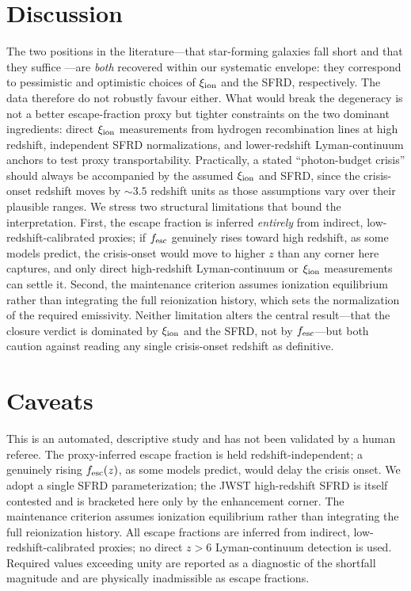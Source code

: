 \documentclass[twocolumn]{aastex631}
\begin{document}
\section{Discussion}
The two positions in the literature---that star-forming galaxies fall short \citep{Munoz2024,Davies2021} and that they suffice \citep{Duncan2015}---are \emph{both} recovered within our systematic envelope: they correspond to pessimistic and optimistic choices of $\xi_{\rm ion}$ and the SFRD, respectively. The data therefore do not robustly favour either. What would break the degeneracy is not a better escape-fraction proxy but tighter constraints on the two dominant ingredients: direct $\xi_{\rm ion}$ measurements from hydrogen recombination lines at high redshift, independent SFRD normalizations, and lower-redshift Lyman-continuum anchors to test proxy transportability. Practically, a stated ``photon-budget crisis'' should always be accompanied by the assumed $\xi_{\rm ion}$ and SFRD, since the crisis-onset redshift moves by $\sim3.5$ redshift units as those assumptions vary over their plausible ranges. We stress two structural limitations that bound the interpretation. First, the escape fraction is inferred \emph{entirely} from indirect, low-redshift-calibrated proxies; if $f_{\rm esc}$ genuinely rises toward high redshift, as some models predict, the crisis-onset would move to higher $z$ than any corner here captures, and only direct high-redshift Lyman-continuum or $\xi_{\rm ion}$ measurements can settle it. Second, the maintenance criterion assumes ionization equilibrium rather than integrating the full reionization history, which sets the normalization of the required emissivity. Neither limitation alters the central result---that the closure verdict is dominated by $\xi_{\rm ion}$ and the SFRD, not by $f_{\rm esc}$---but both caution against reading any single crisis-onset redshift as definitive.

\section{Caveats}
This is an automated, descriptive study and has not been validated by a human referee. The proxy-inferred escape fraction is held redshift-independent; a genuinely rising $f_{\rm esc}(z)$, as some models predict, would delay the crisis onset. We adopt a single SFRD parameterization; the JWST high-redshift SFRD is itself contested and is bracketed here only by the enhancement corner. The maintenance criterion assumes ionization equilibrium rather than integrating the full reionization history. All escape fractions are inferred from indirect, low-redshift-calibrated proxies; no direct $z>6$ Lyman-continuum detection is used. Required values exceeding unity are reported as a diagnostic of the shortfall magnitude and are physically inadmissible as escape fractions.
\end{document}
